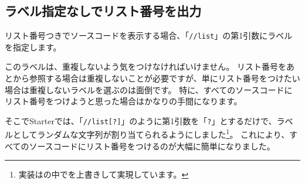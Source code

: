 \starterresult
\begin{starterprogram}
\starterlineno{}
\starterlineno{}
\seqsplit{}
\end{starterprogram}
\endstarterresult

\subsection*{ラベル指定なしでリスト番号を出力}
\label{sec:1-1-9}

リスト番号つきでソースコードを表示する場合、「\texttt{//list}」の第1引数にラベルを指定します。

\begin{starterprogram}\end{starterprogram}
\noindent
{}

\starterresult
{}
\label{samplecode3}
\begin{starterprogram}\end{starterprogram}
\endstarterresult

このラベルは、重複しないよう気をつけなければいけません。
リスト番号をあとから参照する場合は重複しないことが必要ですが、単にリスト番号をつけたい場合は重複しないラベルを選ぶのは面倒です。
特に、すべてのソースコードにリスト番号をつけようと思った場合はかなりの手間になります。

そこでStarterでは、「\texttt{//list[?]}」のように第1引数を「\texttt{?}」とするだけで、ラベルとしてランダムな文字列が割り当てられるようにしました\footnote{実装はの中でを上書きして実現しています。}。
これにより、すべてのソースコードにリスト番号をつけるのが大幅に簡単になりました。

\begin{starterprogram}\end{starterprogram}
\noindent
{}

